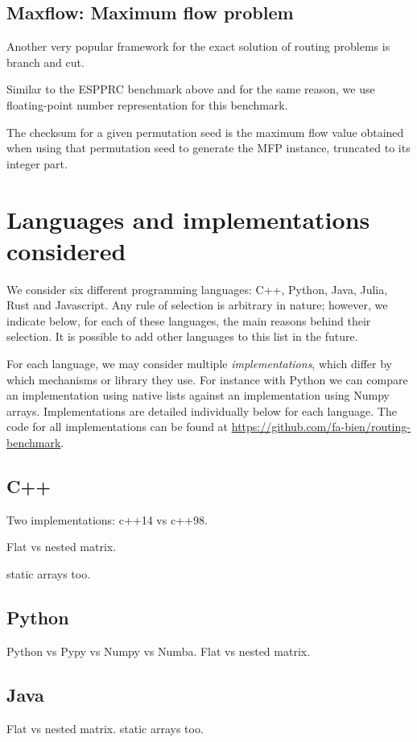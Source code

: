 \documentclass[11pt,a4paper,notitlepage]{article}
\begin{document}
\subsection{Maxflow: Maximum flow problem}
Another very popular framework for the exact solution of routing
problems is branch and cut. \cite{padberg:532}

Similar to the ESPPRC benchmark above and for the same reason, we use
floating-point number representation for this benchmark.

The checksum for a given permutation seed is the maximum flow value
obtained when using that permutation seed to generate the MFP
instance, truncated to its integer part. 

\section{Languages and implementations considered}
We consider six different programming languages: C++, Python, Java,
Julia, Rust and Javascript. Any rule of selection
is arbitrary in nature; however, we indicate below, for each of these
languages, the main reasons behind their selection. It is possible to
add other languages to this list in the future.

For each language, we may consider multiple \emph{implementations},
which differ by which mechanisms or library they use. For
instance with Python we can compare an implementation using native
lists against an implementation using Numpy arrays. Implementations are
detailed individually below for each language. The code for all
implementations can be found at
\url{https://github.com/fa-bien/routing-benchmark}.

\subsection{C++}
Two implementations: c++14 vs c++98.

Flat vs nested matrix.

static arrays too.

\subsection{Python}
Python vs Pypy vs Numpy vs Numba.
Flat vs nested matrix.

\subsection{Java}
Flat vs nested matrix.
static arrays too.
\end{document}
